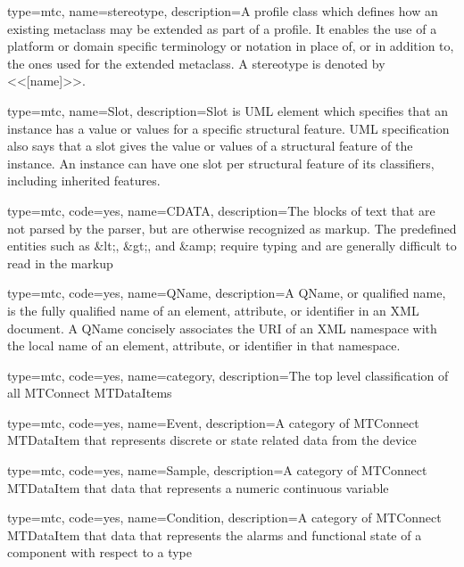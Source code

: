 {
  type=mtc,
  name=stereotype,
  description={A profile class which defines how an existing metaclass may be extended as part of a profile. It enables the use of a platform or domain specific terminology or notation in place of, or in addition to, the ones used for the extended metaclass. A stereotype is denoted by <<[name]>>.}
}

{
  type=mtc,
  name=Slot,
  description={Slot is UML element which specifies that an instance has a value or values for a specific structural feature. UML specification also says that a slot gives the value or values of a structural feature of the instance. An instance can have one slot per structural feature of its classifiers, including inherited features.}
}

{
  type=mtc,
  code=yes,
  name=CDATA,
  description={The blocks of text that are not parsed by the parser, but are otherwise recognized as markup. The predefined entities such as \&lt;, \&gt;, and \&amp; require typing and are generally difficult to read in the markup}
}

{
  type=mtc,
  code=yes,
  name=QName,
  description={A QName, or qualified name, is the fully qualified name of an element, attribute, or identifier in an XML document. A QName concisely associates the URI of an XML namespace with the local name of an element, attribute, or identifier in that namespace.}
}

{
  type=mtc,
  code=yes,
  name=category,
  description={The top level classification of all MTConnect \glspl{MTDataItem}}
}


{
  type=mtc,
  code=yes,
  name=Event,
  description={A category of MTConnect \gls{MTDataItem} that represents discrete or state related data from the device}
}

{
  type=mtc,
  code=yes,
  name=Sample,
  description={A category of MTConnect \gls{MTDataItem} that data that represents a numeric continuous variable}
}

{
  type=mtc,
  code=yes,
  name=Condition,
  description={A category of MTConnect \gls{MTDataItem} that data that represents the alarms and functional state of a component with respect to a \gls{type}}
}


